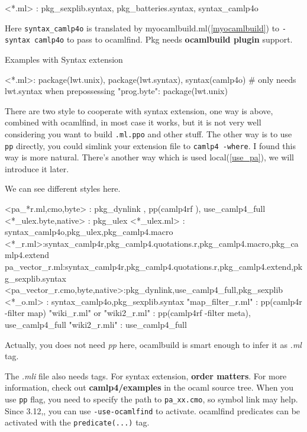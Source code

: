\begin{bashcode}
<*.ml> : pkg_sexplib.syntax, pkg_batteries.syntax, syntax_camlp4o
\end{bashcode}

Here \verb|syntax_camlp4o| is translated by
myocamlbuild.ml(\ref{myocamlbuild}) to \verb|-syntax camlp4o| to pass
to ocamlfind. Pkg needs \textbf{ocamlbuild plugin} support.

Examples with Syntax extension

\begin{bashcode}
<*.ml>: package(lwt.unix), package(lwt.syntax), syntax(camlp4o) # only needs lwt.syntax when prepossessing
"prog.byte": package(lwt.unix)
\end{bashcode}
There are two style to cooperate with syntax extension, one way is
above, combined with ocamlfind, in most case it works, but it is not
very well considering you want to build \verb|.ml.ppo| and other
stuff. The other way is to use \verb|pp| directly, you could simlink
your extension file to \verb|camlp4 -where|. I found this way is more
natural. There's another way which is used local(\ref{use_pa}), we
will introduce it later.

We can see different styles here.

\begin{bashcode}
<pa_*r.{ml,cmo,byte}> : pkg_dynlink , pp(camlp4rf ), use_camlp4_full
<*_ulex.{byte,native}> : pkg_ulex 
<*_ulex.ml> : syntax_camlp4o,pkg_ulex,pkg_camlp4.macro  
<*_r.ml>:syntax_camlp4r,pkg_camlp4.quotations.r,pkg_camlp4.macro,pkg_camlp4.extend 
pa_vector_r.ml:syntax_camlp4r,pkg_camlp4.quotations.r,pkg_camlp4.extend,pkg_sexplib.syntax
<pa_vector_r.{cmo,byte,native}>:pkg_dynlink,use_camlp4_full,pkg_sexplib 
<*_o.ml> : syntax_camlp4o,pkg_sexplib.syntax 
"map_filter_r.ml" : pp(camlp4r -filter map)
"wiki_r.ml" or "wiki2_r.ml"  : pp(camlp4rf -filter meta), use_camlp4_full
"wiki2_r.mli" : use_camlp4_full 
\end{bashcode}
Actually, you does not need \textit{pp} here, ocamlbuild is smart
enough to infer it as \textit{.ml} tag.


The \textit{.mli} file also needs tags. For syntax extension,
\textbf{order matters}. For more information, check out \textbf{
  camlp4/examples} in the ocaml source tree. When you use \verb|pp|
flag, you need to specify the path to \verb|pa_xx.cmo|, so symbol link
may help.  Since 3.12,, you can use \verb|-use-ocamlfind| to
activate. ocamlfind predicates can be activated with the
\verb|predicate(...)| tag.


